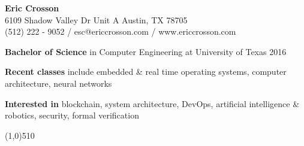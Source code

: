\documentclass{report}
\newcommand{\cut}{\begin{center} \line(1,0){510} \end{center}}
\begin{document}
\pagestyle{empty}
\setlength\parindent{0pt}

\begin{center}
  \textbf{Eric Crosson} \\
  6109 Shadow Valley Dr Unit A Austin, TX 78705 \\
  (512) 222 - 9052 / esc@ericcrosson.com / www.ericcrosson.com
\end{center}

\textbf{Bachelor of Science} in Computer Engineering at University of Texas
2016

\vspace{1mm}

\textbf{Recent classes} include embedded \& real time operating systems,
computer architecture, neural networks

\vspace{1mm}

\textbf{Interested in} blockchain, system architecture, DevOps, artificial intelligence \& robotics, security, formal verification

\cut{}
\end{document}
